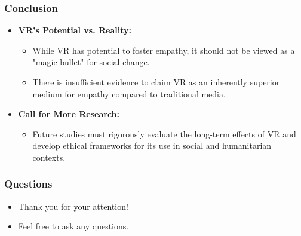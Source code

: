 \documentclass[aspectratio=169,xcolor=dvipsnames]{beamer}
\begin{document}
\begin{frame}
\frametitle{Conclusion}
\begin{itemize}
    \item \textbf{VR’s Potential vs. Reality:}
    \begin{itemize}
        \item While VR has potential to foster empathy, it should not be viewed as a "magic bullet" for social change.
        \item There is insufficient evidence to claim VR as an inherently superior medium for empathy compared to traditional media.
    \end{itemize}
    \item \textbf{Call for More Research:}
    \begin{itemize}
        \item Future studies must rigorously evaluate the long-term effects of VR and develop ethical frameworks for its use in social and humanitarian contexts.
    \end{itemize}
\end{itemize}
\end{frame}

\begin{frame}
\frametitle{Questions}
\begin{itemize}
    \item Thank you for your attention!  
    \item Feel free to ask any questions.
\end{itemize}
\end{frame}
\end{document}
